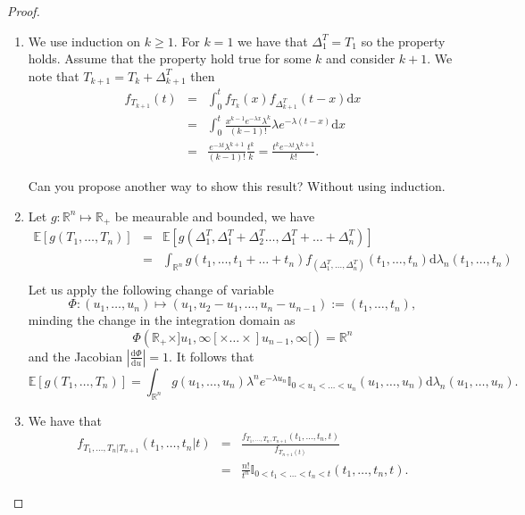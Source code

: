 \begin{proof}
\begin{enumerate}
\item We use induction on $k\geq1$. For $k=1$ we have that $\Delta^T_1= T_1$ so the property holds. Assume that the property hold true for some $k$ and consider $k+1$. We note that $T_{k+1}=T_k+\Delta^T_{k+1}$ then
\begin{eqnarray*}
f_{T_{k+1}}(t)&=&\int_{0}^{t}f_{T_k}(x)f_{\Delta^T_{k+1}}(t-x)\text{d}x\\
&=&\int_{0}^{t}\frac{x^{k-1}e^{-\lambda x}\lambda^k}{(k-1)!}\lambda e^{-\lambda(t-x)}\text{d}x\\
&=&\frac{e^{-\lambda t}\lambda^{k+1}}{(k-1)!}\frac{t^k}{k}=\frac{t^k e^{-\lambda t}\lambda^{k+1}}{k!}.
\end{eqnarray*}
\begin{exercise}
Can you propose another way to show this result? Without using induction.
\end{exercise}
\item Let $g:\mathbb{R}^n\mapsto \mathbb{R}_+$ be meaurable and bounded, we have
\begin{eqnarray*}
\mathbb{E}[g(T_{1},\ldots,T_n)]&=& \mathbb{E}[g(\Delta^T_{1},\Delta^T_1+\Delta^T_2\ldots,\Delta^T_1+\ldots+ \Delta^T_n)]\\
&=&\int_{\mathbb{R}^n}g(t_{1},\ldots,t_1+\ldots+ t_n)f_{(\Delta^T_{1},\ldots,\Delta^T_n)}(t_1,\ldots,t_n)\text{d}\lambda_n(t_{1},\ldots,t_n)\\
\end{eqnarray*}
Let us apply the following change of variable 
$$
\Phi:(u_{1},\ldots,u_n)\mapsto(u_1, u_{2}-u_1,\ldots,u_n-u_{n-1}):=(t_1,\ldots, t_n),$$
minding the change in the integration domain as 
$$
\Phi(\mathbb{R}_+\times ]u_1,\infty[\times \ldots\times ]u_{n-1},\infty[) = \mathbb{R}^n 
$$
and the Jacobian $\left|\frac{\text{d}\Phi}{\text{d}u}\right|=1$. It follows that
$$
\mathbb{E}[g(T_{1},\ldots,T_n)]=\int_{\mathbb{R}^n} g(u_1,\ldots, u_n)\lambda^{n}e^{-\lambda u_n}\mathbb{I}_{0<u_1<\ldots<u_n}(u_1,\ldots, u_n)\text{d}\lambda_{n}(u_1,\ldots, u_n).
$$
\item We have that 
\begin{eqnarray*}
f_{T_1,\ldots, T_n|T_{n+1}}(t_1,\ldots,t_n|t)
&=&\frac{f_{T_1,\ldots, T_n,T_{n+1}}(t_1,\ldots,t_n,t)}{f_{T_{n+1}(t)}}\\
&=&\frac{n!}{t^n}\mathbb{I}_{0<t_1<\ldots< t_n<t}(t_1,\ldots, t_n, t).
\end{eqnarray*}
\end{enumerate}
\end{proof}
